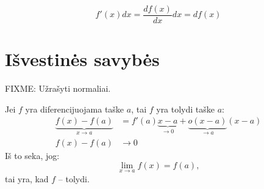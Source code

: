 \begin{note}
  \begin{equation*}
    f'(x) dx = \frac{d f(x)}{d x} d x = d f(x)
  \end{equation*}
\end{note}

\section{Išvestinės savybės}

\begin{note}
  FIXME: Užrašyti normaliai.

  Jei $f$ yra diferencijuojama taške $a$, tai $f$ yra tolydi taške $a$:
  \begin{align*}
    \underbrace{f(x) - f(a)}_{x \to a} 
      &= f'(a)\underbrace{x - a}_{\to 0} + 
      \underbrace{o(x - a)}_{\to a}(x - a) \\
    f(x) - f(a) &\to 0
  \end{align*}
  Iš to seka, jog:
  \begin{equation*}
    \lim _{x \to a} f(x) = f(a),
  \end{equation*}
  tai yra, kad $f$ – tolydi.
\end{note}

